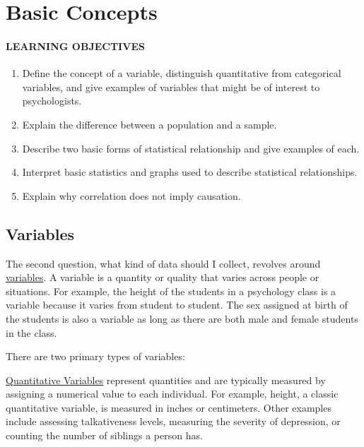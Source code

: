 \documentclass[
]{krantz}
\providecommand{\tightlist}{%
  \setlength{\itemsep}{0pt}\setlength{\parskip}{0pt}}
\begin{document}
\section{Basic Concepts}\label{basic-concepts}

\paragraph*{LEARNING OBJECTIVES}\label{learning-objectives-4}

\begin{enumerate}
\def\labelenumi{\arabic{enumi}.}
\tightlist
\item
  Define the concept of a variable, distinguish quantitative from categorical variables, and give examples of variables that might be of interest to psychologists.
\item
  Explain the difference between a population and a sample.
\item
  Describe two basic forms of statistical relationship and give examples of each.
\item
  Interpret basic statistics and graphs used to describe statistical relationships.
\item
  Explain why correlation does not imply causation.
\end{enumerate}

\subsection*{Variables}\label{variables}


The second question, what kind of data should I collect, revolves around \hyperref[variable]{variables}. A variable is a quantity or quality that varies across people or situations. For example, the height of the students in a psychology class is a variable because it varies from student to student. The sex assigned at birth of the students is also a variable as long as there are both male and female students in the class.

There are two primary types of variables:

\hyperref[quantitative-variables]{Quantitative Variables} represent quantities and are typically measured by assigning a numerical value to each individual. For example, height, a classic quantitative variable, is measured in inches or centimeters. Other examples include assessing talkativeness levels, measuring the severity of depression, or counting the number of siblings a person has.
\end{document}
